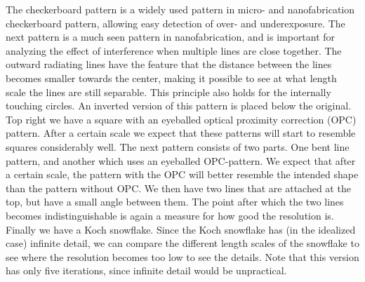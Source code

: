 The checkerboard pattern is a widely used pattern in micro- and nanofabrication
checkerboard pattern, allowing easy detection of over- and underexposure.
The next pattern is a much seen pattern in nanofabrication, and is important for analyzing the effect of interference when multiple lines are close together.
The outward radiating lines have the feature that the distance between the
lines becomes smaller towards the center, making it possible to see at what length scale the lines are still separable. This principle also holds for the
internally touching circles. An
inverted version of this pattern is placed below the original.
Top right we have a square with an eyeballed optical proximity correction (OPC) pattern. After
a certain scale we expect that these patterns will start to resemble squares considerably well.
The next pattern consists of two parts. One bent line pattern, and another which uses an
eyeballed OPC-pattern. We expect that after a certain scale, the pattern with the OPC will better
resemble the intended shape than the pattern without OPC.
We then have two lines that are attached at the top, but have a small angle between them.
The point after which the two lines becomes indistinguishable is again a measure for how good the
resolution is.
Finally we have a Koch snowflake. Since the Koch snowflake has (in the idealized case) infinite
detail, we can compare the different length scales of the snowflake to see where the resolution
becomes too low to see the details. Note that this version has only five iterations, since infinite
detail would be unpractical.